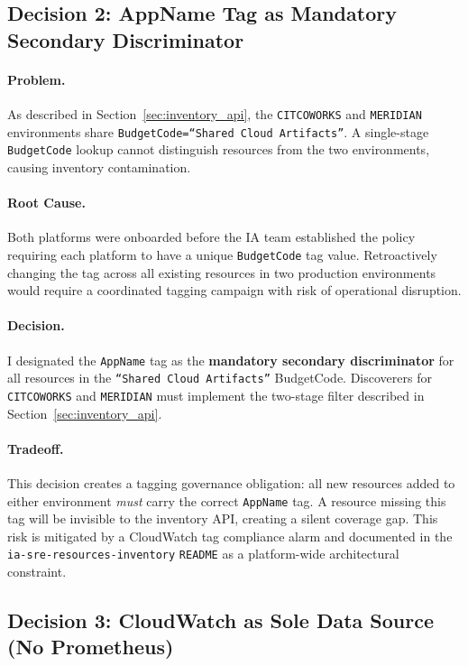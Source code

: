 \subsection{Decision 2: AppName Tag as Mandatory Secondary Discriminator}
\label{sec:decision_appname}

\paragraph{Problem.}
As described in Section~\ref{sec:inventory_api}, the \texttt{CITCOWORKS}
and \texttt{MERIDIAN} environments share \texttt{BudgetCode=``Shared Cloud
Artifacts''}. A single-stage \texttt{BudgetCode} lookup cannot distinguish
resources from the two environments, causing inventory contamination.

\paragraph{Root Cause.}
Both platforms were onboarded before the IA team established the
policy requiring each platform to have a unique
\texttt{BudgetCode} tag value. Retroactively changing the tag across
all existing resources in two production environments would require
a coordinated tagging campaign with risk of operational disruption.

\paragraph{Decision.}
I designated the \texttt{AppName} tag as the \textbf{mandatory secondary
discriminator} for all resources in the \texttt{``Shared Cloud Artifacts''}
BudgetCode. Discoverers for \texttt{CITCOWORKS} and \texttt{MERIDIAN}
must implement the two-stage filter described in
Section~\ref{sec:inventory_api}.

\paragraph{Tradeoff.}
This decision creates a tagging governance obligation: all new resources
added to either environment \emph{must} carry the correct \texttt{AppName}
tag. A resource missing this tag will be invisible to the inventory API,
creating a silent coverage gap. This risk is mitigated by a CloudWatch
tag compliance alarm and documented in the \texttt{ia-sre-resources-inventory}
\texttt{README} as a platform-wide architectural constraint.

\subsection{Decision 3: CloudWatch as Sole Data Source (No Prometheus)}
\label{sec:decision_cloudwatch_only}

